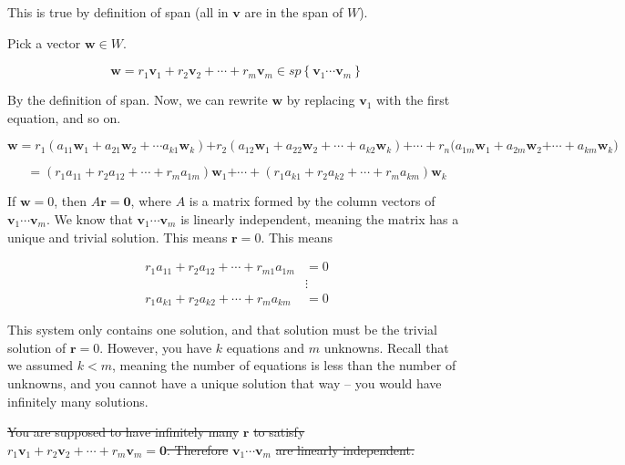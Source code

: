 \documentclass[12pt]{article}
\theoremstyle{plain}
\theoremstyle{remark}
\theoremstyle{definition}
\begin{document}
This is true by definition of span (all in \(\mathbf{v}\) are in the
span of \(W\)).

Pick a vector \(\mathbf{w} \in W\).

\[{\mathbf{w} }{= r_{1}{\mathbf{v}}_{1} + r_{2}{\mathbf{v}}_{2} + \cdots + r_{m}{\mathbf{v}}_{m} }{\in sp\left\{ {\mathbf{v}}_{1}\cdots{\mathbf{v}}_{m} \right\}} \]

By the definition of span. Now, we can rewrite \(\mathbf{w}\) by
replacing \({\mathbf{v}}_{1}\) with the first equation, and so on.

\[{\mathbf{w} }{= r_{1}\left( a_{11}{\mathbf{w}}_{1} + a_{21}{\mathbf{w}}_{2} + \cdots a_{k1}{\mathbf{w}}_{k} \right) }{+ r_{2}\left( a_{12}{\mathbf{w}}_{1} + a_{22}{\mathbf{w}}_{2} + \cdots + a_{k2}{\mathbf{w}}_{k} \right) }{+ \cdots + r_{n}(a_{1m}{\mathbf{w}}_{1} + a_{2m}{\mathbf{w}}_{2} }{+ \cdots + a_{km}{\mathbf{w}}_{k})} \]

\[{}{= \left( r_{1}a_{11} + r_{2}a_{12} + \cdots + r_{m}a_{1m} \right){\mathbf{w}}_{1} }{+ \cdots + \left( r_{1}a_{k1} + r_{2}a_{k2} + \cdots + r_{m}a_{km} \right){\mathbf{w}}_{k}} \]

If \(\mathbf{w} = 0\), then \(A\mathbf{r} = \mathbf{0}\),
where \(A\) is a matrix formed by the column vectors of
\({\mathbf{v}}_{1}\cdots{\mathbf{v}}_{m}\). We know that
\({\mathbf{v}}_{1}\cdots{\mathbf{v}}_{m}\) is linearly
independent, meaning the matrix has a unique and trivial solution. This
means \(\mathbf{r} = 0\). This means

\begin{align*}
r_{1}a_{11} + r_{2}a_{12} + \cdots + r_{m1}a_{1m} &= 0 \\
&\vdots  \\
r_{1}a_{k1} + r_{2}a_{k2} + \cdots + r_{m}a_{km} &= 0
\end{align*}


This system only contains one solution, and that solution must be the
trivial solution of \(\mathbf{r} = 0\). However, you have \(k\)
equations and \(m\) unknowns. Recall that we assumed \(k < m\), meaning
the number of equations is less than the number of unknowns, and you
cannot have a unique solution that way -- you would have infinitely many
solutions.

\sout{You are supposed to have infinitely many} \(\mathbf{r}\)
\sout{to satisfy}
\(r_{1}{\mathbf{v}}_{1} + r_{2}{\mathbf{v}}_{2} + \cdots + r_{m}{\mathbf{v}}_{m} = \mathbf{0}\)\sout{.
Therefore} \({\mathbf{v}}_{1}\cdots{\mathbf{v}}_{m}\) \sout{are
linearly independent.}
\end{document}
